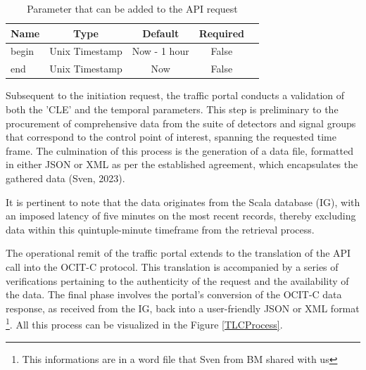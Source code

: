\documentclass[12pt]{report}
\begin{document}
	\begin{table}
		\centering
		\begin{tabular}{|p{0.1\textheight}|c|c|c|c|}
			\hline
			Name & Type & Default & Required  \\
			\hline
			begin & Unix Timestamp & Now - 1 hour & False\\
			\hline
			end & Unix Timestamp & Now & False \\
			\hline
			
		\end{tabular}
		\caption{Parameter that can be added to the API request}
		\label{table_param_TLC}
	\end{table}
	
	\vspace{-2cm}
	Subsequent to the initiation request, the traffic portal conducts a validation of both the 'CLE' and the temporal parameters. This step is preliminary to the procurement of comprehensive data from the suite of detectors and signal groups that correspond to the control point of interest, spanning the requested time frame. The culmination of this process is the generation of a data file, formatted in either JSON or XML as per the established agreement, which encapsulates the gathered data (Sven, 2023).
	
	It is pertinent to note that the data originates from the Scala database (IG), with an imposed latency of five minutes on the most recent records, thereby excluding data within this quintuple-minute timeframe from the retrieval process.
	
	The operational remit of the traffic portal extends to the translation of the API call into the OCIT-C protocol. This translation is accompanied by a series of verifications pertaining to the authenticity of the request and the availability of the data. The final phase involves the portal's conversion of the OCIT-C data response, as received from the IG, back into a user-friendly JSON or XML format \footnote{This informations are in a word file that Sven from BM shared with  us}. All this process can be visualized in the Figure \ref{TLCProcess}.
	
\end{document}
